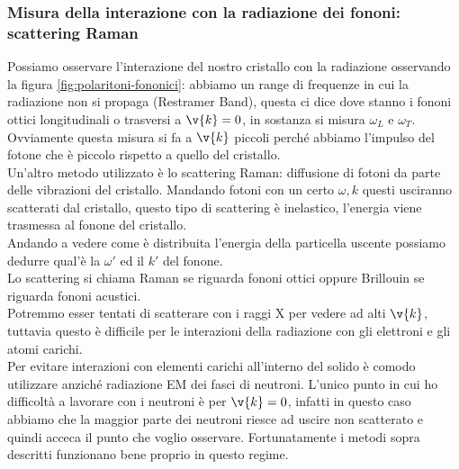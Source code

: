 \subsubsection{Misura della interazione con la radiazione dei fononi: scattering Raman}
\label{subsubsec:Misura della interazione con la radiazione dei fononi}
Possiamo osservare l'interazione del nostro cristallo con la radiazione osservando la figura \ref{fig:polaritoni-fononici}: abbiamo un range di frequenze in cui la radiazione non si propaga (Restramer Band), questa ci dice dove stanno i fononi ottici longitudinali o trasversi a $\v{k}=0$, in sostanza si misura $\omega_L$ e $\omega_T$. Ovviamente questa misura si fa a $\v{k}$ piccoli perché abbiamo l'impulso del fotone che è piccolo rispetto a quello del cristallo.\\
Un'altro metodo utilizzato è lo scattering Raman: diffusione di fotoni da parte delle vibrazioni del cristallo. 
Mandando fotoni con un certo $\omega , k$ questi usciranno scatterati dal cristallo, questo tipo di scattering è inelastico, l'energia viene trasmessa al fonone del cristallo.\\
Andando a vedere come è distribuita l'energia della particella uscente possiamo dedurre qual'è la $\omega '$ ed il $k'$ del fonone.\\
Lo scattering si chiama Raman se riguarda fononi ottici oppure Brillouin se riguarda fononi acustici.\\
Potremmo esser tentati di scatterare con i raggi X per vedere ad alti $\v{k}$, tuttavia questo è difficile per le interazioni della radiazione con gli elettroni e gli atomi carichi.\\
Per evitare interazioni con elementi carichi all'interno del solido è comodo utilizzare anziché radiazione EM dei fasci di neutroni. L'unico punto in cui ho difficoltà a lavorare con i neutroni è per $\v{k}=0$, infatti in questo caso abbiamo che la maggior parte dei neutroni riesce ad uscire non scatterato e quindi acceca il punto che voglio osservare. Fortunatamente i metodi sopra descritti funzionano bene proprio in questo regime.
